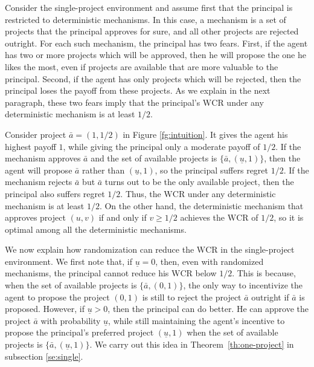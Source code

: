 \documentclass[12pt,english]{article}
\newcommand{\under}{\underline}
\newcommand{\underu}{{\underline{u}}}
\theoremstyle{remark}
\theoremstyle{plain}
\theoremstyle{definition}
\newcommand{\wcr}{\mathrm{WCR}}
\begin{document}
Consider the single-project environment and assume first that the principal is restricted to deterministic mechanisms. In this case, a mechanism is a set of projects that the principal approves for sure, and all other projects are rejected outright. For each such mechanism, the principal has two fears. First, if the agent has two or more projects which will be approved, then he will propose the one he likes the most, even if projects are available that are more valuable to the principal. Second, if the agent has only projects which will be rejected, then the principal loses the payoff from these projects. As we explain in the next paragraph, these two fears imply that the principal's $\wcr$ under any deterministic mechanism is at least $1/2$.




 


Consider project $\bar{a}=(1,1/2)$ in Figure \ref{fg:intuition}. It gives the agent his highest payoff $1$, while giving the principal only a moderate payoff of $1/2$. If the mechanism approves $\bar{a}$ and the set of available projects is $\{\bar{a}, (\under u, 1)\}$, then the agent will propose $\bar{a}$ rather than $(\under u, 1)$, so the principal suffers regret $1/2$. If the mechanism rejects $\bar{a}$ but $\bar{a}$ turns out to be the only available project, then the principal also suffers regret $1/2$. Thus, the $\wcr$ under any deterministic mechanism is at least $1/2$. On the other hand, the deterministic mechanism that approves project $(u,v)$ if and only if $v\geqslant 1/2$ achieves the $\wcr$ of $1/2$, so it is optimal among all the deterministic mechanisms.  


We now explain how randomization can reduce the $\wcr$ in the single-project environment. We first note that, if $\underu=0$, then, even with randomized mechanisms, the principal cannot reduce his $\wcr$ below $1/2$. This is because, when the set of available projects is $\{\bar{a},(0,1)\}$, the only way to incentivize the agent to propose the project $(0,1)$ is still to reject the project $\bar{a}$ outright if $\bar{a}$ is proposed. However, if $\underu>0$, then the principal can do better. He can approve the project $\bar{a}$ with probability $\underu$, while still maintaining the agent's incentive to propose the principal's preferred project $(\underu, 1)$ when the set of available projects is $\{\bar{a}, (\under u, 1)\}$. We carry out this idea in Theorem~\ref{th:one-project} in subsection \ref{se:single}.
\end{document}
